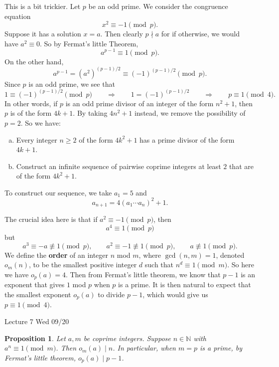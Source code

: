 \documentclass{article}
\def\N{{\mathbb N}}
\newtheorem{proposition}[subsection]{Proposition}
\newcommand{\add}[1]{{\color{blue} #1}}
\begin{document}
This is a bit trickier. Let $p$ be an odd prime. We consider the congruence equation $$x^2\equiv -1\pmod{p}.$$
Suppose it has a solution $x = a$. Then clearly $p\nmid a$ for if otherwise, we would have $a^2\equiv 0$. So by Fermat's little Theorem, $$a^{p-1}\equiv 1\pmod{p}.$$
On the other hand, $$a^{p-1} = (a^2)^{(p-1)/2} \equiv (-1)^{(p-1)/2}\pmod{p}.$$
Since $p$ is an odd prime, we see that $$1\equiv(-1)^{(p-1)/2}\pmod{p} \qquad\Rightarrow\qquad 1 = (-1)^{(p-1)/2} \qquad\Rightarrow\qquad p\equiv 1\pmod{4}.$$
In other words, if $p$ is an odd prime divisor of an integer of the form $n^2 + 1$, then $p$ is of the form $4k+1$. By taking $4n^2 + 1$ instead, we remove the possibility of $p=2$. So we have:
\begin{enumerate}[(a)]
    \item Every integer $n\geq2$ of the form $4k^2+1$ has a prime divisor of the form $4k+1$.
    \item Construct an infinite sequence of pairwise coprime integers at least $2$ that are of the form $4k^2+1$.
\end{enumerate}
To construct our sequence, we take $a_1 = 5$ and
$$a_{n+1} = 4(a_1\cdots a_n)^2 + 1.$$


\vspace{5pt}
The crucial idea here is that if $a^2\equiv -1\pmod{p}$, then 
$$a^4\equiv 1\pmod{p}$$
but
$$a^3\equiv -a\not\equiv 1\pmod{p},\qquad a^2\equiv -1\not\equiv 1\pmod{p},\qquad a\not\equiv 1\pmod{p}.$$
We define the \textbf{order} of an integer $n$ mod $m$, where $\gcd(n,m) = 1$, denoted $o_m(n)$, to be the smallest positive integer $d$ such that $n^d \equiv 1\pmod{m}.$ So here we have $o_p(a) = 4$. Then from Fermat's little theorem, we know that $p-1$ is an exponent that gives $1$ mod $p$ when $p$ is a prime. It is then natural to expect that the smallest exponent $o_p(a)$ to divide $p-1$, which would give us $p\equiv 1\pmod{4}$.


\begin{center}
    \add{Lecture 7 Wed 09/20}
\end{center}

\begin{proposition}\label{prop:lag}
    Let $a,m$ be coprime integers. Suppose $n\in\N$ with $a^n\equiv 1\pmod{m}$. Then $o_m(a)\mid n$. In particular, when $m = p$ is a prime, by Fermat's little theorem, $o_p(a)\mid p-1$.
\end{proposition}
\end{document}

